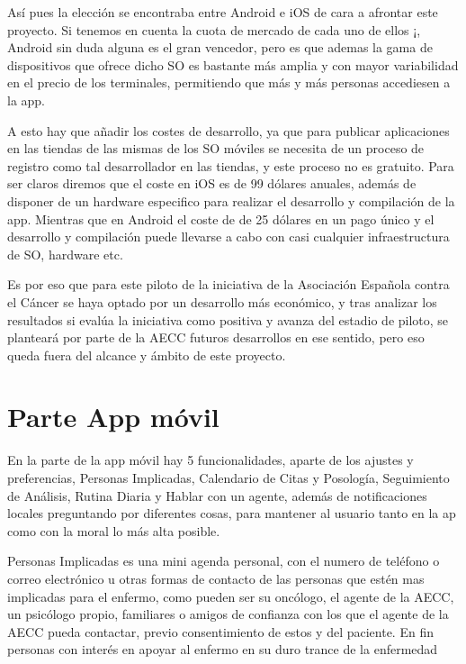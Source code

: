 \documentclass[../pfc.tex]{subfiles}
\begin{document}
	Así pues la elección se encontraba entre Android e iOS de cara a afrontar este proyecto. Si tenemos en cuenta la cuota de mercado de cada uno de ellos ¡, Android sin duda alguna es el gran vencedor, pero es que ademas la gama de dispositivos que ofrece dicho SO es bastante más amplia y con mayor variabilidad en el precio de los terminales, permitiendo que más y más personas accediesen a la app. 
	
	A esto hay que añadir los costes de desarrollo, ya que para publicar aplicaciones en las tiendas de las mismas de los SO móviles se necesita de un proceso de registro como tal desarrollador en las tiendas, y este proceso no es gratuito. Para ser claros diremos que el coste en iOS es de 99 dólares anuales, además de disponer de un hardware especifico para realizar el desarrollo y compilación de la app. Mientras que en Android el coste de de 25 dólares en un pago único y el desarrollo y compilación puede llevarse a cabo con casi cualquier infraestructura de SO, hardware etc. 
	
	Es por eso que para este piloto de la iniciativa de la Asociación Española contra el Cáncer se haya optado por un desarrollo más económico, y tras analizar los resultados si evalúa la iniciativa como positiva y avanza del estadio de piloto, se planteará por parte de la AECC futuros desarrollos en ese sentido, pero eso queda fuera del alcance y ámbito de este proyecto. 

	\section{Parte App móvil}
	
	En la parte de la app móvil hay 5 funcionalidades, aparte de los ajustes y preferencias, Personas Implicadas, Calendario de Citas y Posología, Seguimiento de Análisis, Rutina Diaria y Hablar con un agente, además de notificaciones locales preguntando por diferentes cosas, para mantener al usuario tanto en la ap como con la moral lo más alta posible.
	
	Personas Implicadas es una mini agenda personal, con el numero de teléfono o correo electrónico u otras formas de contacto de las personas que estén mas implicadas para el enfermo, como pueden ser su oncólogo, el agente de la AECC, un psicólogo propio, familiares o amigos de confianza con los que el agente de la AECC pueda contactar, previo consentimiento de estos y del paciente. En fin personas con interés en apoyar al enfermo en su duro trance de la enfermedad
	
\end{document}
